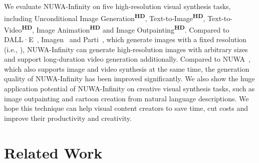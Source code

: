 \documentclass{article}
\begin{document}
We evaluate NUWA-Infinity on five high-resolution visual synthesis tasks, including Unconditional Image Generation\textsuperscript{\textbf{HD}}, Text-to-Image\textsuperscript{\textbf{HD}}, Text-to-Video\textsuperscript{\textbf{HD}}, Image Animation\textsuperscript{\textbf{HD}} and Image Outpainting\textsuperscript{\textbf{HD}}. Compared to DALL·E~\cite{rameshZeroShotTexttoImageGeneration2021}, Imagen~\cite{sahariaPhotorealisticTexttoImageDiffusion2022} and Parti~\cite{yuScalingAutoregressiveModels2022}, which generate images with a fixed resolution (i.e., ), NUWA-Infinity can generate high-resolution images with arbitrary sizes and support long-duration video generation additionally. Compared to NUWA~\cite{wuUWAVisualSynthesis2022}, which also supports image and video synthesis at the same time, the generation quality of NUWA-Infinity has been improved significantly. We also show the huge application potential of NUWA-Infinity on creative visual synthesis tasks, such as image outpainting and cartoon creation from natural language descriptions. We hope this technique can help visual content creators to save time, cut costs and improve their productivity and creativity.








































\section{Related Work}\label{sec:relatedwork}
\vspace{-2mm}
\end{document}
